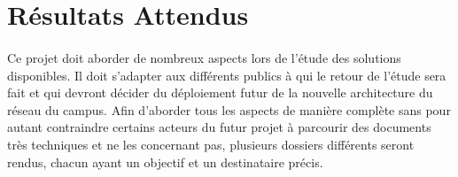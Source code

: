 \section{Résultats Attendus}
\paragraph{} Ce projet doit aborder de nombreux aspects lors de l'étude des solutions disponibles. Il doit s'adapter aux différents publics à qui le retour de l'étude sera fait et qui devront décider du déploiement futur de la nouvelle architecture du réseau du campus. Afin d'aborder tous les aspects de manière complète sans pour autant contraindre certains acteurs du futur projet à parcourir des documents très techniques et ne les concernant pas, plusieurs dossiers différents seront rendus, chacun ayant un objectif et un destinataire précis. \\

